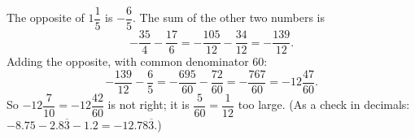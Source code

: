 The opposite of $1\dfrac{1}{5}$ is $-\dfrac{6}{5}$. The sum of the other two numbers is
\[
-\dfrac{35}{4}-\dfrac{17}{6}=-\dfrac{105}{12}-\dfrac{34}{12}=-\dfrac{139}{12}.
\]
Adding the opposite, with common denominator $60$:
\[
-\dfrac{139}{12}-\dfrac{6}{5}=-\dfrac{695}{60}-\dfrac{72}{60}=-\dfrac{767}{60}=\boxed{-12\dfrac{47}{60}}.
\]
So $-12\dfrac{7}{10}=-12\dfrac{42}{60}$ is not right; it is $\dfrac{5}{60}=\dfrac{1}{12}$ too large. (As a check in decimals: $-8.75-2.8\overline{3}-1.2=-12.78\overline{3}$.)
